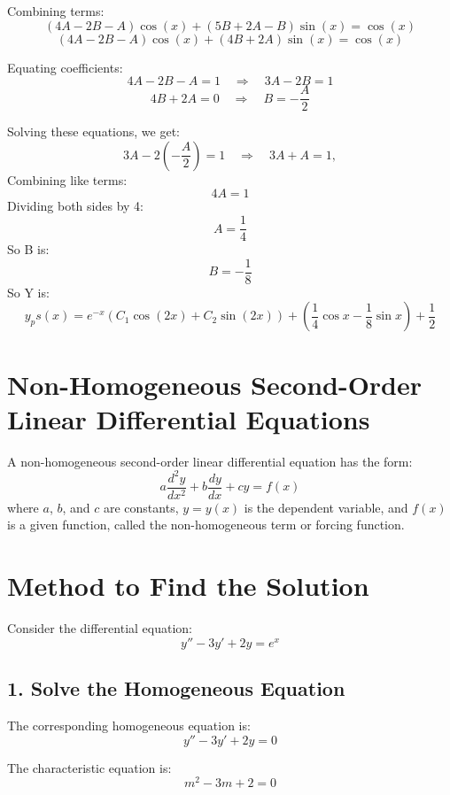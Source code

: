 \documentclass[a4paper,12pt]{article}
\begin{document}
Combining terms:
\[
(4A - 2B - A) \cos(x) + (5B + 2A - B) \sin(x) = \cos(x)
\]
\[
(4A - 2B - A) \cos(x) + (4B + 2A) \sin(x) = \cos(x)
\]

Equating coefficients:
\[
4A - 2B - A = 1 \quad \Rightarrow \quad 3A - 2B = 1
\]
\[
4B + 2A = 0 \quad \Rightarrow \quad B = -\frac{A}{2}
\]

Solving these equations, we get:
\[
3A - 2\left(-\frac{A}{2}\right) = 1 \quad \Rightarrow \quad 3A + A = 1, 
\]
Combining like terms:
\[
4A = 1
\]
Dividing both sides by 4:
\[
A = \frac{1}{4}
\]
So B is:
\[
B = -\frac{1}{8}
\]
So Y is:
\[
y_ps(x)  = e^{-x} (C_1 \cos(2x) + C_2 \sin(2x)) + (\frac{1}{4}\cos{x} - \frac{1}{8}\sin{x}) + \frac{1}{2}
\]


\section*{Non-Homogeneous Second-Order Linear Differential Equations}

A non-homogeneous second-order linear differential equation has the form:
\[
a \frac{d^2 y}{dx^2} + b \frac{dy}{dx} + c y = f(x)
\]
where \(a\), \(b\), and \(c\) are constants, \(y = y(x)\) is the dependent variable, and \(f(x)\) is a given function, called the non-homogeneous term or forcing function.


\section*{Method to Find the Solution}

Consider the differential equation:
\[
y'' - 3y' + 2y = e^x
\]

\subsection*{1. Solve the Homogeneous Equation}

The corresponding homogeneous equation is:
\[
y'' - 3y' + 2y = 0
\]

The characteristic equation is:
\[
m^2 - 3m + 2 = 0
\]
\end{document}
